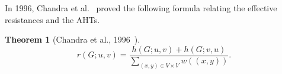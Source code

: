 \documentclass[12pt, leqno]{amsart}
\numberwithin{equation}{section}
\theoremstyle{plain}
\newtheorem{thm}{Theorem}[section]
\theoremstyle{definition}
\newcommand{\ZZ}{\mathbb{Z}}
\newcommand{\0}{\mathbf{0}}
\DeclareMathOperator{\Cay}{Cay}
\begin{document}
In 1996, Chandra et al.~\cite{CRRST} proved the following formula relating the effective resistances and the AHTs.

\begin{thm}[Chandra et al., 1996~\cite{CRRST}]
\[
r(G;u,v)=\frac{h(G;u,v)+h(G;v,u)}{\sum_{(x,y)\in V\times V}w((x,y))}.
\]
\end{thm}

\end{document}
